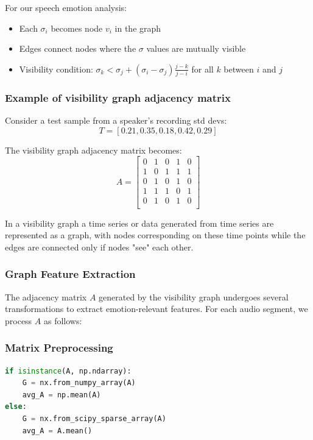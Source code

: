 \documentclass{article}
\begin{document}
For our speech emotion analysis:
\begin{itemize}
    \item Each $\sigma_i$ becomes node $v_i$ in the graph
    \item Edges connect nodes where the $\sigma$ values are mutually visible
    \item Visibility condition: $\sigma_k < \sigma_j + (\sigma_i - \sigma_j)\frac{j-k}{j-i}$ for all $k$ between $i$ and $j$
\end{itemize}

\subsubsection{Example of visibility graph adjacency matrix}
Consider a test sample from a speaker's recording std devs:
\begin{equation}
T = [0.21, 0.35, 0.18, 0.42, 0.29]
\end{equation}

The visibility graph adjacency matrix becomes:
\begin{equation}
A = \begin{bmatrix}
0 & 1 & 0 & 1 & 0 \\
1 & 0 & 1 & 1 & 1 \\
0 & 1 & 0 & 1 & 0 \\
1 & 1 & 1 & 0 & 1 \\
0 & 1 & 0 & 1 & 0 \\
\end{bmatrix}
\end{equation}

In a visibility graph a time series or data generated from time series are represented as a graph,
with nodes corresponding on these time points
while the edges are connected only if nodes "see" each other.

\subsubsection{Graph Feature Extraction}

The adjacency matrix $A$ generated by the visibility graph undergoes several transformations to extract emotion-relevant features. For each audio segment, we process $A$ as follows:

\subsubsection{Matrix Preprocessing}
\begin{lstlisting}[language=Python]
if isinstance(A, np.ndarray):
    G = nx.from_numpy_array(A)
    avg_A = np.mean(A)
else:
    G = nx.from_scipy_sparse_array(A)
    avg_A = A.mean()
\end{lstlisting}
\end{document}
